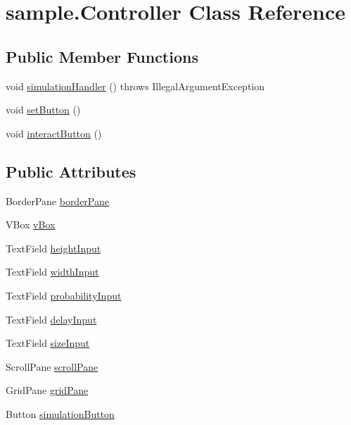 \hypertarget{classsample_1_1_controller}{}\section{sample.\+Controller Class Reference}
\label{classsample_1_1_controller}
\subsection*{Public Member Functions}
\begin{DoxyCompactItemize}
\item 
void \mbox{\hyperlink{classsample_1_1_controller_a40542380181cd69e668251ad13af45f9}{simulation\+Handler}} ()  throws Illegal\+Argument\+Exception 
\item 
void \mbox{\hyperlink{classsample_1_1_controller_a14f5cbc0ad69bf34dd5e90c523b01854}{set\+Button}} ()
\item 
void \mbox{\hyperlink{classsample_1_1_controller_a79be9406ea2fa98dedc999537e0558d1}{interact\+Button}} ()
\end{DoxyCompactItemize}
\subsection*{Public Attributes}
\begin{DoxyCompactItemize}
\item 
Border\+Pane \mbox{\hyperlink{classsample_1_1_controller_a90ba7075d9657608b5e9effe8b4e74c5}{border\+Pane}}
\item 
V\+Box \mbox{\hyperlink{classsample_1_1_controller_ae1185ca87cc80bdf888a9eb07539a36d}{v\+Box}}
\item 
Text\+Field \mbox{\hyperlink{classsample_1_1_controller_a61ab7fe17e1a96f14f965056922b4d4b}{height\+Input}}
\item 
Text\+Field \mbox{\hyperlink{classsample_1_1_controller_ad9880682037a42f6599d159c05c7c20b}{width\+Input}}
\item 
Text\+Field \mbox{\hyperlink{classsample_1_1_controller_a561bd4249661c5cb867a2bcf7c194638}{probability\+Input}}
\item 
Text\+Field \mbox{\hyperlink{classsample_1_1_controller_a209c6739e975878b7b2635620624702a}{delay\+Input}}
\item 
Text\+Field \mbox{\hyperlink{classsample_1_1_controller_a4888b98db3ddac3e6e8406cb4255de66}{size\+Input}}
\item 
Scroll\+Pane \mbox{\hyperlink{classsample_1_1_controller_a6ae4635010cc6607c1427f9d29d3e5be}{scroll\+Pane}}
\item 
Grid\+Pane \mbox{\hyperlink{classsample_1_1_controller_a82454b05f9f8f2b9cb84f42efe025f99}{grid\+Pane}}
\item 
Button \mbox{\hyperlink{classsample_1_1_controller_a735c1a047f1cb2e0b91e09442c08a6cf}{simulation\+Button}}
\end{DoxyCompactItemize}
